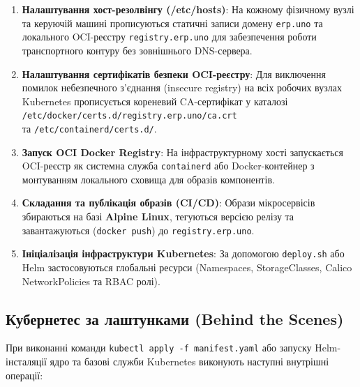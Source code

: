 \documentclass[12pt,a4paper]{article}
\begin{document}
\begin{enumerate}[leftmargin=1.5cm]
    \item \textbf{Налаштування хост-резолвінгу (/etc/hosts)}: На кожному фізичному вузлі та керуючій машині прописуються статичні записи домену \texttt{erp.uno} та локального OCI-реєстру \texttt{registry.erp.uno} для забезпечення роботи транспортного контуру без зовнішнього DNS-сервера.
    \item \textbf{Налаштування сертифікатів безпеки OCI-реєстру}: Для виключення помилок небезпечного з'єднання (insecure registry) на всіх робочих вузлах Kubernetes прописується кореневий CA-сертифікат у каталозі \\ \texttt{/etc/docker/certs.d/registry.erp.uno/ca.crt} \\ та \texttt{/etc/containerd/certs.d/}.
    \item \textbf{Запуск OCI Docker Registry}: На інфраструктурному хості запускається OCI-реєстр як системна служба \texttt{containerd} або Docker-контейнер з монтуванням локального сховища для образів компонентів.
    \item \textbf{Складання та публікація образів (CI/CD)}: Образи мікросервісів збираються на базі \textbf{Alpine Linux}, тегуються версією релізу та завантажуються (\texttt{docker push}) до \texttt{registry.erp.uno}.
    \item \textbf{Ініціалізація інфраструктури Kubernetes}: За допомогою \texttt{deploy.sh} або Helm застосовуються глобальні ресурси (Namespaces, StorageClasses, Calico NetworkPolicies та RBAC ролі).
\end{enumerate}

\subsection{Кубернетес за лаштунками (Behind the Scenes)}

При виконанні команди \texttt{kubectl apply -f manifest.yaml} або запуску Helm-інсталяції ядро та базові служби Kubernetes виконують наступні внутрішні операції:
\end{document}
